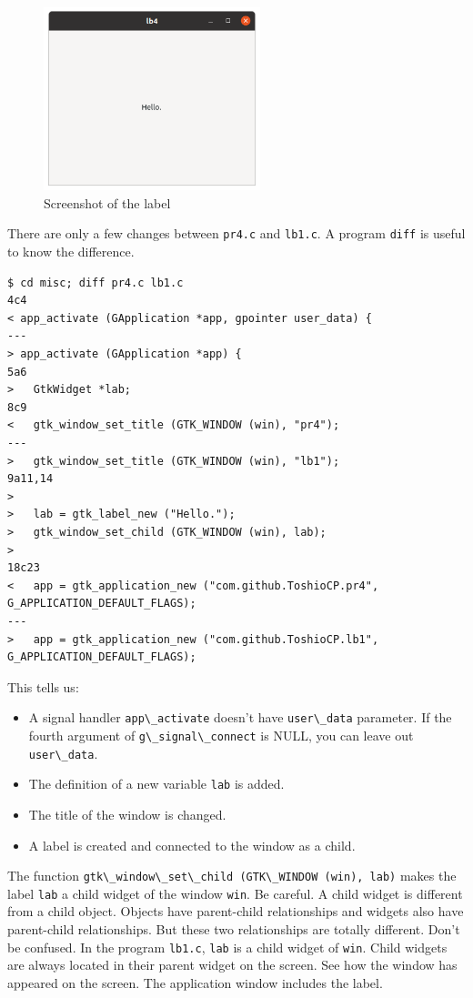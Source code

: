 \begin{figure}
\centering
\includegraphics[width=6.3cm,height=5.325cm]{../image/screenshot_lb1.png}
\caption{Screenshot of the label}
\end{figure}

There are only a few changes between \passthrough{\lstinline!pr4.c!} and
\passthrough{\lstinline!lb1.c!}. A program
\passthrough{\lstinline!diff!} is useful to know the difference.

\begin{lstlisting}
$ cd misc; diff pr4.c lb1.c
4c4
< app_activate (GApplication *app, gpointer user_data) {
---
> app_activate (GApplication *app) {
5a6
>   GtkWidget *lab;
8c9
<   gtk_window_set_title (GTK_WINDOW (win), "pr4");
---
>   gtk_window_set_title (GTK_WINDOW (win), "lb1");
9a11,14
> 
>   lab = gtk_label_new ("Hello.");
>   gtk_window_set_child (GTK_WINDOW (win), lab);
> 
18c23
<   app = gtk_application_new ("com.github.ToshioCP.pr4", G_APPLICATION_DEFAULT_FLAGS);
---
>   app = gtk_application_new ("com.github.ToshioCP.lb1", G_APPLICATION_DEFAULT_FLAGS);
\end{lstlisting}

This tells us:

\begin{itemize}
\tightlist
\item
  A signal handler \passthrough{\lstinline!app\_activate!} doesn't have
  \passthrough{\lstinline!user\_data!} parameter. If the fourth argument
  of \passthrough{\lstinline!g\_signal\_connect!} is NULL, you can leave
  out \passthrough{\lstinline!user\_data!}.
\item
  The definition of a new variable \passthrough{\lstinline!lab!} is
  added.
\item
  The title of the window is changed.
\item
  A label is created and connected to the window as a child.
\end{itemize}

The function
\passthrough{\lstinline!gtk\_window\_set\_child (GTK\_WINDOW (win), lab)!}
makes the label \passthrough{\lstinline!lab!} a child widget of the
window \passthrough{\lstinline!win!}. Be careful. A child widget is
different from a child object. Objects have parent-child relationships
and widgets also have parent-child relationships. But these two
relationships are totally different. Don't be confused. In the program
\passthrough{\lstinline!lb1.c!}, \passthrough{\lstinline!lab!} is a
child widget of \passthrough{\lstinline!win!}. Child widgets are always
located in their parent widget on the screen. See how the window has
appeared on the screen. The application window includes the label.

